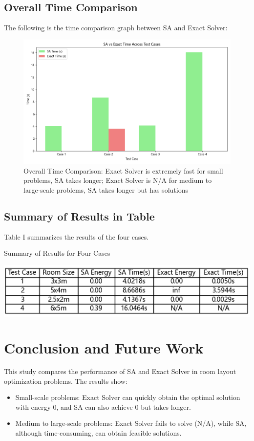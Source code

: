 \documentclass[conference]{IEEEtran}
\begin{document}
\FloatBarrier %

\subsection{Overall Time Comparison}
The following is the time comparison graph between SA and Exact Solver:

\begin{figure}[!htbp]
    \centering
    \includegraphics[width=0.8\columnwidth]{time_comparison.png} 
    \caption{Overall Time Comparison: Exact Solver is extremely fast for small problems, SA takes longer; Exact Solver is N/A for medium to large-scale problems, SA takes longer but has solutions}
    \label{fig:time_comparison}
\end{figure}

\FloatBarrier %

\subsection{Summary of Results in Table}
Table I summarizes the results of the four cases.

\begin{table}[!htbp]
\centering
\caption{Summary of Results for Four Cases}
\includegraphics[width=0.8\columnwidth]{results_comparison_table.png} 
\label{tab:results_summary}
\end{table}

\FloatBarrier %

\section{Conclusion and Future Work}
This study compares the performance of SA and Exact Solver in room layout optimization problems. The results show:
\begin{itemize}
    \item Small-scale problems: Exact Solver can quickly obtain the optimal solution with energy 0, and SA can also achieve 0 but takes longer.
    \item Medium to large-scale problems: Exact Solver fails to solve (N/A), while SA, although time-consuming, can obtain feasible solutions.
\end{itemize}
\end{document}

